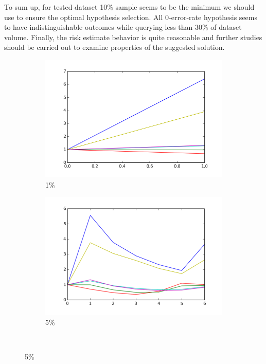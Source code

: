 \documentclass[12pt, a4paper, pdflatex, leqno, twoside]{report}
\begin{document}
To sum up, for tested dataset 10\% sample seems to be the minimum we should use 
to ensure the optimal hypothesis selection. All 0-error-rate hypothesis seems to 
have indistinguishable outcomes while querying less than 30\% of dataset 
volume. Finally, the risk estimate behavior is quite reasonable and further studies should be 
carried out to examine properties of the suggested solution.\\

\begin{figure}[htbp]
  \begin{subfigure}{.5\linewidth}\centering
    \includegraphics[width=1.1\textwidth]{graphics/convergence01.png}
    \caption{1\%\label{fig:conv.ALL:01}}
  \end{subfigure}
  \begin{subfigure}{.5\linewidth}\centering
    \includegraphics[width=1.1\textwidth]{graphics/convergence05.png}
    \caption{5\%\label{fig:conv.ALL:05}}
  \end{subfigure}\\[1ex]


\end{figure}
\end{document}
